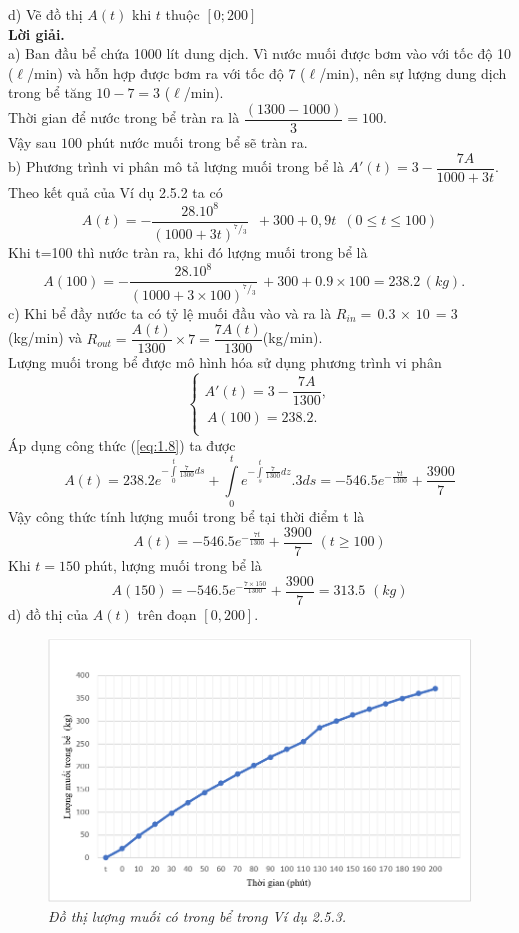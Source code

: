   d) Vẽ đồ thị $A(t)$ khi $t$ thuộc $[0;200]$\\
\textbf{Lời giải. }\\
a) Ban đầu bể chứa 1000 lít dung dịch. Vì nước muối được bơm vào với tốc độ 10 ($\ell$/min) và hỗn hợp được bơm ra với tốc độ 7 ($\ell$/min), nên sự lượng dung dịch trong bể tăng $10-7=3$ ($\ell$/min).\\
Thời gian để nước trong bể tràn ra là $\dfrac{\left( 1300-1000 \right)}{3}=100$. \\
Vậy sau $100$ phút nước muối trong bể sẽ tràn ra.\\
b) Phương trình vi phân mô tả lượng muối trong bể là ${A}'(t)=3-\dfrac{7A}{1000+3t}$.\\
Theo kết quả của Ví dụ 2.5.2 ta có $$A(t)=-\dfrac{{{28.10}^{8}}}{{{(1000+3t)}^{{}^{7}/{}_{3}}}}\,\,\,+300+0,9t\,\,\,(0\le t\le 100)$$
Khi t=100 thì nước tràn ra, khi đó lượng muối trong bể là
$$A(100)=-\dfrac{{{28.10}^{8}}}{{{(1000+3\times 100)}^{{}^{7}/{}_{3}}}}\,+300+0.9\times 100=238.2\,(kg).\,\,\,\,\,$$
c) Khi bể đầy nước ta có tỷ lệ muối đầu vào và ra là
${{R}_{in}}=\,0.3\,\times \,10\,=3\,$(kg/min) và ${{R}_{out}}=\dfrac{A(t)}{1300}\times 7=\dfrac{7A(t)}{1300}$(kg/min).\\
Lượng muối trong bể được mô hình hóa sử dụng phương trình vi phân
$$\left\{ \begin{array}{l}
	 {A}'(t)=3-\dfrac{7A}{1300}, \\ 
	 \,A(100)=238.2. \\ 
\end{array} \right.$$
Áp dụng công thức (\ref{eq:1.8}) ta được
$$A(t)=238.2{{e}^{-\int\limits_{0}^{t}{\frac{7}{1300}ds}}}+\int\limits_{0}^{t}{{{e}^{-\int\limits_{s}^{t}{\frac{7}{1300}dz}}}.3}ds=-546.5{{e}^{-\frac{7t}{1300}}}+ \dfrac{3900}{7}$$
Vậy công thức tính lượng muối trong bể  tại thời điểm t là 
$$A(t)=-546.5{{e}^{-\frac{7t}{1300}}}+\dfrac{3900}{7}\,\,(t\ge 100)$$
Khi $t=150$ phút, lượng muối trong bể là  
$$A(150)=-546.5{{e}^{-\frac{7\times 150}{1300}}}+\dfrac{3900}{7}=313.5\,\,(kg)$$
d) đồ thị của $A(t)$ trên đoạn $\left[0, 200\right]$.
 \begin{figure}[H]
	\centering
	\includegraphics[scale=0.8]{Images/hinh_2_13.png}
	\caption[Đồ thị lượng muối có trong bể trong Ví dụ 2.5.3.
	]{\itshape\fontsize{13pt}{0pt}\selectfont\centering Đồ thị lượng muối có trong bể trong Ví dụ 2.5.3.}
	\label{hinh2.13}
\end{figure}
